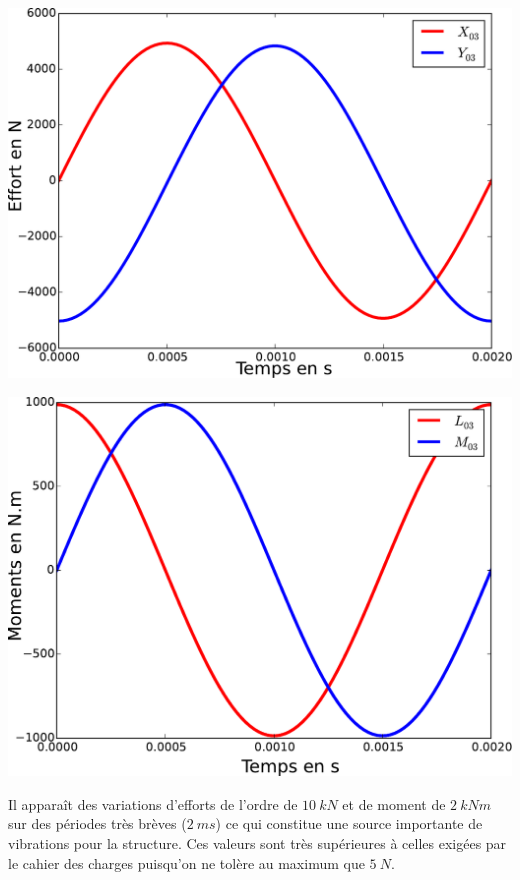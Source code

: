 \documentclass[10pt,fleqn]{article} %
\begin{document}
\begin{prop}
\begin{center}
\begin{minipage}{0.45\textwidth}
\begin{center}
\includegraphics[width=1.0\textwidth]{images/effort.pdf}
\end{center}
\end{minipage}
\begin{minipage}{0.45\textwidth}
\begin{center}
\includegraphics[width=1.0\textwidth]{images/moment.pdf}
\end{center}
\end{minipage}
\end{center}

Il apparaît des variations d'efforts de l'ordre de $\SI{10}{kN}$ et de moment de $\SI{2}{kN m}$ sur des périodes très brèves ($\SI{2}{ms}$) ce qui constitue une source importante de vibrations pour la structure. Ces valeurs sont très supérieures à celles exigées par le cahier des charges puisqu'on ne tolère au maximum que $\SI{5}{N}$.
\end{prop}
\end{document}
